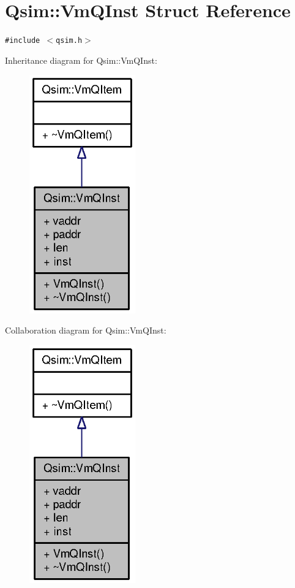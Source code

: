 \section{Qsim::VmQInst Struct Reference}
\label{structQsim_1_1VmQInst}
{\tt \#include $<$qsim.h$>$}

Inheritance diagram for Qsim::VmQInst:\nopagebreak
\begin{figure}[H]
\begin{center}
\leavevmode
\includegraphics[width=130pt]{structQsim_1_1VmQInst__inherit__graph}
\end{center}
\end{figure}
Collaboration diagram for Qsim::VmQInst:\nopagebreak
\begin{figure}[H]
\begin{center}
\leavevmode
\includegraphics[width=130pt]{structQsim_1_1VmQInst__coll__graph}
\end{center}
\end{figure}
